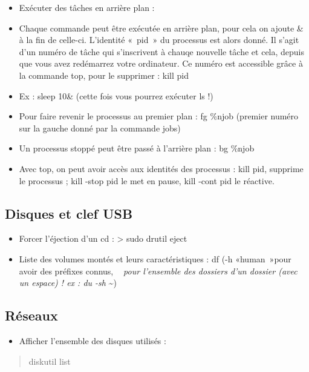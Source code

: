 \begin{itemize}
\item
  Exécuter des tâches en arrière plan :
\item
  Chaque commande peut être exécutée en arrière plan, pour cela on
  ajoute \& à la fin de celle-ci. L'identité «~pid~» du processus est
  alors donné. Il s'agit d'un numéro de tâche qui s'inscrivent à chauqe
  nouvelle tâche et cela, depuis que vous avez redémarrez votre
  ordinateur. Ce numéro est accessible grâce à la commande top, pour le
  supprimer : kill pid
\item
  Ex : sleep 10\& (cette fois vous pourrez exécuter ls !)
\item
  Pour faire revenir le processus au premier plan : fg \%njob (premier
  numéro sur la gauche donné par la commande jobs)
\item
  Un processus stoppé peut être passé à l'arrière plan : bg \%njob
\item
  Avec top, on peut avoir accès aux identités des processus : kill pid,
  supprime le processus ; kill -stop pid le met en pause, kill -cont pid
  le réactive.
\end{itemize}

\subsection{Disques et clef USB}\label{disques-et-clef-usb}

\begin{itemize}
\item
  Forcer l'éjection d'un cd : \textgreater{} sudo drutil eject
\item
  Liste des volumes montés et leurs caractéristiques : df (-h
  «human~»pour avoir des préfixes connus, \emph{~ pour l'ensemble des
  dossiers d'un dossier (avec un espace) ! ex : du -sh }
  \textasciitilde{})
\end{itemize}

\subsection{Réseaux}\label{ruxe9seaux}

\begin{itemize}
\tightlist
\item
  Afficher l'ensemble des disques utilisés :
\end{itemize}

\begin{quote}
diskutil list
\end{quote}

